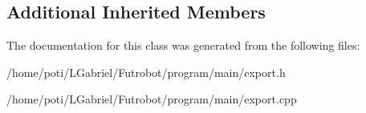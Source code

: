 \subsection*{Additional Inherited Members}


The documentation for this class was generated from the following files\+:\begin{DoxyCompactItemize}
\item 
/home/poti/\+L\+Gabriel/\+Futrobot/program/main/export.\+h\item 
/home/poti/\+L\+Gabriel/\+Futrobot/program/main/export.\+cpp\end{DoxyCompactItemize}
